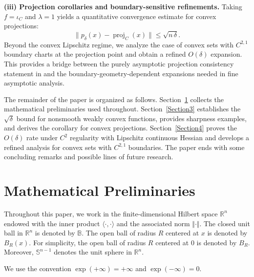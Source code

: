 \documentclass[11pt]{amsart}
\newcommand{\1}{\mathds{1}}
\theoremstyle{definition}
\theoremstyle{remark}
\theoremstyle{definition}
\newcommand{\proj}{\operatorname{proj}}
\begin{document}
\noindent\textbf{(iii) Projection corollaries and boundary-sensitive refinements.}
Taking \(f=\iota_C\) and $\lambda=1$ yields a quantitative convergence estimate for convex projections:
\[
\|p_\delta(x)-\proj_C(x)\|\le \sqrt{n\,\delta}.
\]
Beyond the convex Lipschitz regime, we analyze the case of convex sets with \(C^{2,1}\) boundary charts at the projection point and obtain a refined \(O(\delta)\) expansion.
This provides a bridge between the purely asymptotic projection consistency statement in \cite{MR4923371} and the boundary-geometry-dependent expansions needed in fine asymptotic analysis. 


The remainder of the paper is organized as follows.
Section~\ref{preliminaries} collects the mathematical preliminaries used throughout.
Section~\ref{Section3} establishes the \(\sqrt{\delta}\) bound for nonsmooth weakly convex functions,
provides sharpness examples, and derives the corollary for convex projections.
Section~\ref{Section4} proves the \(O(\delta)\) rate under \(C^2\) regularity with Lipschitz continuous Hessian
and develops a refined analysis for convex sets with \(C^{2,1}\) boundaries. The paper ends with some concluding remarks and possible lines of future research.

\section{Mathematical Preliminaries}\label{preliminaries}
Throughout this paper, we work in the finite-dimensional Hilbert space $\mathbb{R}^n$ endowed with the inner product $\langle \cdot, \cdot\rangle$ and the associated norm $\Vert \cdot\Vert$. The closed unit ball in $\mathbb{R}^n$ is denoted by $\mathbb{B}$. The open ball of radius $R$ centered at $x$ is denoted by $B_R(x)$. For simplicity, the open ball of radius $R$ centered at $0$ is denoted by $B_R$. Moreover, $\mathbb{S}^{n-1}$ denotes the unit sphere in $\mathbb{R}^n$.

We use the convention $\exp(+\infty) =+\infty $ and $\exp( -\infty ) = 0$.  
\end{document}
